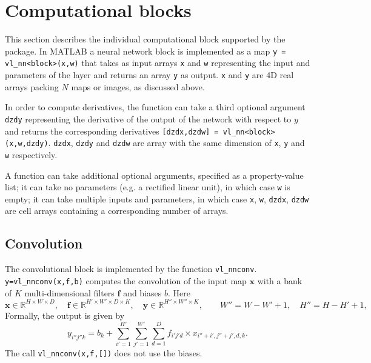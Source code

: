 \documentclass[12pt]{article}
\newcommand{\real}{\mathbb{R}}
\newcommand{\bx}{\mathbf{x}}
\newcommand{\by}{\mathbf{y}}
\newcommand{\bff}{\mathbf{f}}
\begin{document}
\section{Computational blocks}

This section describes the individual computational block supported by the package. In MATLAB a neural network block is implemented as a map \verb!y = vl_nn<block>(x,w)! that takes as input arrays \verb!x! and \verb!w! representing the input and parameters of the layer and returns an array \verb!y! as output. \verb!x! and \verb!y! are 4D real arrays packing $N$ maps or images, as discussed above. 

In order to compute derivatives, the function can take a third optional argument \verb!dzdy! representing the derivative of the output of the network with respect to $y$ and returns the corresponding derivatives \verb![dzdx,dzdw] = vl_nn<block>(x,w,dzdy)!. \verb!dzdx!, \verb!dzdy! and \verb!dzdw! are array with the same dimension of \verb!x!, \verb!y! and \verb!w! respectively.

A function can take additional optional arguments, specified as a property-value list; it can take no parameters (e.g. a rectified linear unit), in which case \verb!w! is empty; it can take multiple inputs and parameters, in which case \verb!x!, \verb!w!, \verb!dzdx!, \verb!dzdw! are cell arrays containing a corresponding number of arrays.

\subsection{Convolution}\label{s:convolution}

The convolutional block is implemented by the function \verb!vl_nnconv!. \verb!y=vl_nnconv(x,f,b)! computes the convolution of the input map $\bx$ with a bank of $K$ multi-dimensional filters $\bff$ and biases $b$. Here
\[
 \bx\in\real^{H \times W \times D}, \quad
 \bff\in\real^{H' \times W' \times D \times K}, \quad
 \by\in\real^{H'' \times W'' \times K}, \quad
 \quad
 W'' = W - W' + 1,
 \quad
 H'' = H - H' + 1,
\]
Formally, the output  is given by
\[
y_{i''j''k}
=
b_k
+
\sum_{i'=1}^{H'}
\sum_{j'=1}^{W'}
\sum_{d=1}^D
f_{i'j'd} \times x_{i''+i',j''+j',d,k}.
\]
The call \verb!vl_nnconv(x,f,[])! does not use the biases.
\end{document}
